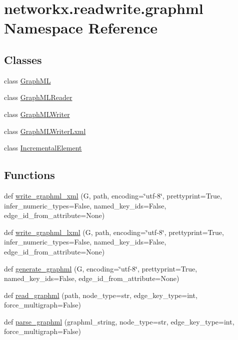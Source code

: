 \hypertarget{namespacenetworkx_1_1readwrite_1_1graphml}{}\section{networkx.\+readwrite.\+graphml Namespace Reference}
\label{namespacenetworkx_1_1readwrite_1_1graphml}
\subsection*{Classes}
\begin{DoxyCompactItemize}
\item 
class \hyperlink{classnetworkx_1_1readwrite_1_1graphml_1_1GraphML}{Graph\+ML}
\item 
class \hyperlink{classnetworkx_1_1readwrite_1_1graphml_1_1GraphMLReader}{Graph\+M\+L\+Reader}
\item 
class \hyperlink{classnetworkx_1_1readwrite_1_1graphml_1_1GraphMLWriter}{Graph\+M\+L\+Writer}
\item 
class \hyperlink{classnetworkx_1_1readwrite_1_1graphml_1_1GraphMLWriterLxml}{Graph\+M\+L\+Writer\+Lxml}
\item 
class \hyperlink{classnetworkx_1_1readwrite_1_1graphml_1_1IncrementalElement}{Incremental\+Element}
\end{DoxyCompactItemize}
\subsection*{Functions}
\begin{DoxyCompactItemize}
\item 
def \hyperlink{namespacenetworkx_1_1readwrite_1_1graphml_a402f85085b78287200232129e44d5415}{write\+\_\+graphml\+\_\+xml} (G, path, encoding=\char`\"{}utf-\/8\char`\"{}, prettyprint=True, infer\+\_\+numeric\+\_\+types=False, named\+\_\+key\+\_\+ids=False, edge\+\_\+id\+\_\+from\+\_\+attribute=None)
\item 
def \hyperlink{namespacenetworkx_1_1readwrite_1_1graphml_aa2b8982d923038f1e66ce2863daa637f}{write\+\_\+graphml\+\_\+lxml} (G, path, encoding=\char`\"{}utf-\/8\char`\"{}, prettyprint=True, infer\+\_\+numeric\+\_\+types=False, named\+\_\+key\+\_\+ids=False, edge\+\_\+id\+\_\+from\+\_\+attribute=None)
\item 
def \hyperlink{namespacenetworkx_1_1readwrite_1_1graphml_ae3cad67ecd404c7d3c5aa7e3a960c698}{generate\+\_\+graphml} (G, encoding=\char`\"{}utf-\/8\char`\"{}, prettyprint=True, named\+\_\+key\+\_\+ids=False, edge\+\_\+id\+\_\+from\+\_\+attribute=None)
\item 
def \hyperlink{namespacenetworkx_1_1readwrite_1_1graphml_a8347c9f63d34bba3e57c48f043835e2e}{read\+\_\+graphml} (path, node\+\_\+type=str, edge\+\_\+key\+\_\+type=int, force\+\_\+multigraph=False)
\item 
def \hyperlink{namespacenetworkx_1_1readwrite_1_1graphml_abeff394d286bd6994a649c8bdddd5a17}{parse\+\_\+graphml} (graphml\+\_\+string, node\+\_\+type=str, edge\+\_\+key\+\_\+type=int, force\+\_\+multigraph=False)
\end{DoxyCompactItemize}
